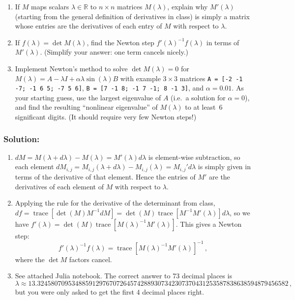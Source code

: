 \documentclass[10pt,oneside]{article}
\newcommand{\tr}{\operatorname{trace}}
\begin{document}
\begin{enumerate}

\item If $M$ maps scalars $\lambda \in \mathbb{R}$ to $n\times n$ matrices $M(\lambda)$, explain why $M'(\lambda)$ (starting from the general definition of derivatives in class) is simply a matrix whose entries are the derivatives of each entry of $M$ with respect to $\lambda$.

\item If $f(\lambda) = \det M(\lambda)$, find the Newton step $f'(\lambda)^{-1} f(\lambda)$ in terms of $M'(\lambda)$.  (Simplify your answer: one term cancels nicely.)

\item Implement Newton's method to solve $\det M(\lambda) = 0$ for $M(\lambda) = A - \lambda I + \alpha \lambda \sin(\lambda) B$ with example $3\times 3$ matrices \texttt{A = [-2 -1 -7; -1 6 5; -7 5 6]}, \texttt{B = [7 -1 8; -1 7 -1; 8 -1 3]}, and $\alpha = 0.01$.  As your starting guess, use the largest eigenvalue of $A$ (i.e.~a solution for $\alpha = 0$), and find the resulting ``nonlinear eigenvalue'' of $M(\lambda)$ to at least~6 significant digits.  (It should require very few Newton steps!)

\end{enumerate}

\subsubsection*{Solution:}

\begin{enumerate}

\item $dM = M(\lambda + d\lambda) - M(\lambda) = M'(\lambda) d\lambda$ is element-wise subtraction, so each element $dM_{i,j} = M_{i,j}(\lambda + d\lambda) - M_{i,j}(\lambda) = M_{i,j}' d\lambda$ is simply given in terms of the derivative of that element.  Hence the entries of $M'$ are the derivatives of each element of $M$ with respect to $\lambda$.

\item Applying the rule for the derivative of the determinant from class, $df = \tr[\det(M) M^{-1} dM] = \det(M) \tr[ M^{-1} M'(\lambda)] d\lambda$, so we have $f'(\lambda) = \det(M) \tr[ M(\lambda)^{-1} M'(\lambda)]$.   This gives a Newton step:
$$
f'(\lambda)^{-1} f(\lambda) = \boxed{\tr[ M(\lambda)^{-1} M'(\lambda)]^{-1}} \, ,
$$
where the $\det M$ factors cancel.

\item See attached Julia notebook.  The correct answer to 73 decimal places is $$\boxed{\lambda \approx 13.3245807095348859129767072645742889307342307370431253587838638594879456582} \, ,$$ but you were only asked to get the first 4 decimal places right.

\end{enumerate}
\end{document}
